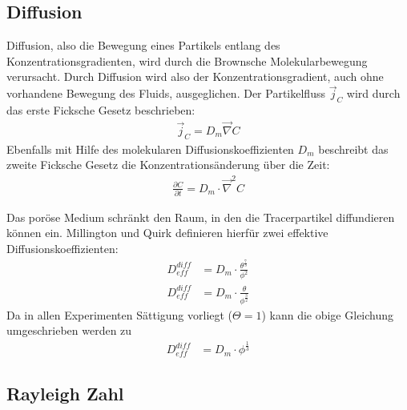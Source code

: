 
\subsection{Diffusion}
\label{sec:diff}
Diffusion, also die Bewegung eines Partikels entlang des Konzentrationsgradienten, wird durch die Brownsche Molekularbewegung verursacht. Durch Diffusion wird also der Konzentrationsgradient, auch ohne vorhandene Bewegung des Fluids, ausgeglichen. Der Partikelfluss $\vec{j}_C$ wird durch das erste Ficksche Gesetz beschrieben:
\begin{align}
 \vec{j}_C = D_m \vec{\nabla} C
\end{align}
Ebenfalls mit Hilfe des molekularen Diffusionskoeffizienten $D_m$ beschreibt das zweite Ficksche Gesetz die Konzentrationsänderung über die Zeit:
\begin{align}
 \frac{\partial C}{\partial t} = D_m \cdot \vec{\nabla}^2 C
\end{align}

Das poröse Medium schränkt den Raum, in den die Tracerpartikel diffundieren können ein. Millington und Quirk \citeyearpar{milli-quir} definieren hierfür zwei 
effektive Diffusionskoeffizienten:
\begin{align}
 D_{eff}^{diff} &= D_m \cdot \frac{\theta^{\frac{7}{3}}}{\phi^2} \\
 D_{eff}^{diff} &= D_m \cdot \frac{\theta}{              \phi^\frac{3}{2}}
\end{align}
Da in allen Experimenten Sättigung vorliegt ($\Theta = 1$) kann die obige Gleichung umgeschrieben werden zu
\begin{align}
 D_{eff}^{diff} &= D_m \cdot \phi^{\frac{1}{3}}
 \label{eq:Deff}
\end{align}

\subsection{Rayleigh Zahl}
\label{sec:ray}

